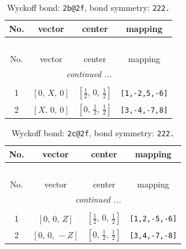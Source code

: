 \documentclass[fleqn,8pt]{jsarticle}
\begin{document}
\renewcommand{\arraystretch}{1.2}
\begin{longtable}{cccc}
\caption{Wyckoff bond: {\tt 2b@2f}, bond symmetry: {\tt 222.}}
 \\
 \hline \hline
No. & vector & center & mapping \\ \hline \endfirsthead

\multicolumn{3}{l}{\tablename\ \thetable{}} \\
 \hline \hline
No. & vector & center & mapping \\ \hline \endhead

 \hline \hline
\multicolumn{3}{r}{\footnotesize\it continued ...} \\ \endfoot

 \hline \hline
\multicolumn{3}{r}{} \\ \endlastfoot

1 & $\left[ 0,\, X,\, 0 \right]$ & $\left[ \frac{1}{2},\, 0,\, \frac{1}{2} \right]$ & {\tt [1,-2,5,-6]} \\ \hline
2 & $\left[ X,\, 0,\, 0 \right]$ & $\left[ 0,\, \frac{1}{2},\, \frac{1}{2} \right]$ & {\tt [3,-4,-7,8]} \\
\end{longtable}
\renewcommand{\arraystretch}{1.2}
\begin{longtable}{cccc}
\caption{Wyckoff bond: {\tt 2c@2f}, bond symmetry: {\tt 222.}}
 \\
 \hline \hline
No. & vector & center & mapping \\ \hline \endfirsthead

\multicolumn{3}{l}{\tablename\ \thetable{}} \\
 \hline \hline
No. & vector & center & mapping \\ \hline \endhead

 \hline \hline
\multicolumn{3}{r}{\footnotesize\it continued ...} \\ \endfoot

 \hline \hline
\multicolumn{3}{r}{} \\ \endlastfoot

1 & $\left[ 0,\, 0,\, Z \right]$ & $\left[ \frac{1}{2},\, 0,\, \frac{1}{2} \right]$ & {\tt [1,2,-5,-6]} \\ \hline
2 & $\left[ 0,\, 0,\, - Z \right]$ & $\left[ 0,\, \frac{1}{2},\, \frac{1}{2} \right]$ & {\tt [3,4,-7,-8]} \\
\end{longtable}
\renewcommand{\arraystretch}{1.2}
\end{document}
